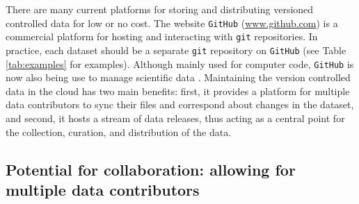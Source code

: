 \documentclass[a4paper,11pt]{article}
\newcommand{\smurl}[1]{{\footnotesize\url{#1}}}
\begin{document}
There are many current platforms for storing and distributing versioned controlled data for low or no cost.  The website \texttt{GitHub} (\smurl{www.github.com}) is a commercial platform for hosting and interacting with \texttt{git} repositories. In practice, each dataset should be a separate \texttt{git} repository on \texttt{GitHub} (see Table \ref{tab:examples} for examples). Although mainly used for computer code, \texttt{GitHub} is now also being use to manage scientific data \citep{Perkel-2016}. Maintaining the version controlled data in the cloud has two main benefits: first, it provides a platform for multiple data contributors to sync their files and correspond about changes in the dataset, and second, it hosts a stream of data releases, thus acting as a central point for  the collection, curation, and distribution of the data.


\subsection{Potential for collaboration: allowing for multiple data contributors}
\end{document}
